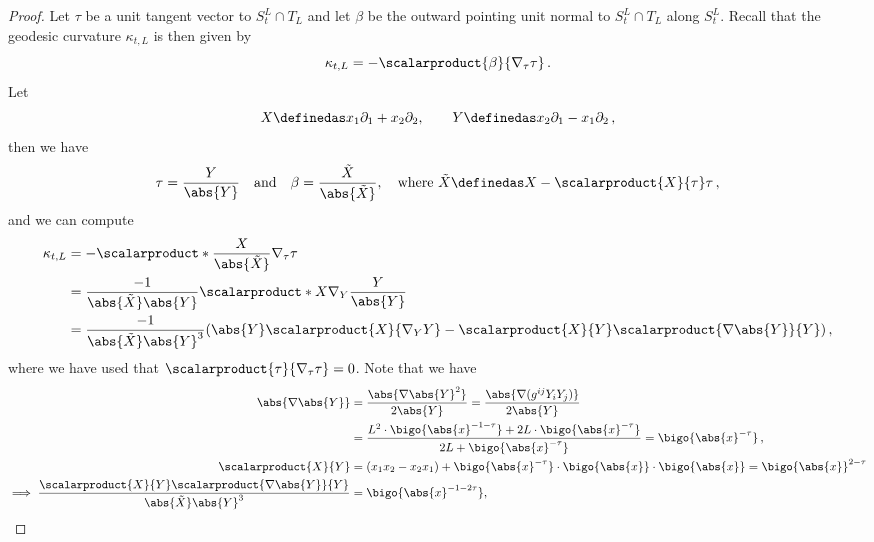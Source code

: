 \documentclass[titlepage,numbers=noenddot,oneside,%
cleardoublepage=empty,paper=a4,fontsize=11pt,%
english,%
]{scrartcl}
\newcommand*{\mathcomma}{\,,}
\newcommand*{\mathfullstop}{\,.}
\begin{document}
\begin{proof}
    Let \( \tau \) be a unit tangent vector to \( S_t^L\cap T_L \) and let \( \beta \) be the outward pointing unit normal to \( S_t^L\cap T_L \) along \( S_t^L \). Recall that the geodesic curvature \( \kappa_{t,L} \) is then given by 
    \begin{equation*}
        \kappa_{t,L}=-\scalarproduct{\beta}{\nabla_{\tau}\tau}\mathfullstop
    \end{equation*}
    Let
    \begin{equation*}
        X\definedas x_1 \partial_1+x_2 \partial_2,\qquad Y\definedas x_2 \partial_1-x_1 \partial_2\mathcomma
    \end{equation*}
    then we have
    \begin{equation*}
        \tau=\frac{Y}{\abs{Y}}\quad \text{and}\quad \beta=\frac{\tilde{X}}{\abs{\tilde{X}}},\quad \text{where \( \tilde{X}\definedas X-\scalarproduct{X}{\tau}\tau \)}\mathcomma
    \end{equation*}
    and we can compute
    \begin{equation*}
       \kappa_{t,L}\begin{aligned}[t]
            &=-\scalarproduct*{\frac{X}{\abs{\tilde{X}}}}{\nabla_{\tau}\tau}\\
            &=\frac{-1}{\abs{\tilde{X}}\abs{Y}}\scalarproduct*{X}{\nabla_Y\frac{Y}{\abs{Y}}}\\
            &=\frac{-1}{\abs{\tilde{X}}\abs{Y}^3}(\abs{Y}\scalarproduct{X}{\nabla_Y Y}-\scalarproduct{X}{Y}\scalarproduct{\nabla\abs{Y}}{Y})\mathcomma
        \end{aligned}
    \end{equation*}
    where we have used that \( \scalarproduct{\tau}{\nabla_{\tau}\tau}=0 \). Note that we have
    \begin{align*}
        \abs{\nabla\abs{Y}}&\begin{aligned}[t]
            &=\frac{\abs{\nabla \abs{Y}^2}}{2\abs{Y}}=\frac{\abs{\nabla(g^{ij}Y_i Y_j)}}{2\abs{Y}}\\
            &=\frac{L^2 \cdot \bigo{\abs{x}^{-1-\tau}}+2L\cdot \bigo{\abs{x}^{-\tau}}}{2L+\bigo{\abs{x}^{-\tau}}}=\bigo{\abs{x}^{-\tau}}\mathcomma
        \end{aligned}\\
        \scalarproduct{X}{Y}&=(x_1x_2-x_2x_1)+\bigo{\abs{x}^{-\tau}}\cdot\bigo{\abs{x}}\cdot \bigo{\abs{x}}=\bigo{\abs{x}}^{2-\tau}\\
        \implies \frac{\scalarproduct{X}{Y}\scalarproduct{\nabla\abs{Y}}{Y}}{\abs{\tilde{X}}\abs{Y}^3}&=\bigo{\abs{x}^{-1-2\tau}},\\

\end{align*}
\end{proof}
\end{document}
